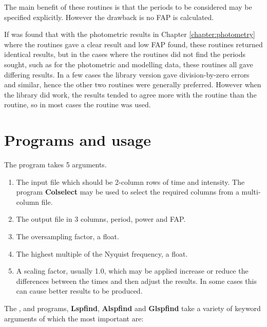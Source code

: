 The main benefit of these routines is that the periods to be considered may be specified explicitly. However the
drawback is no FAP is calculated.

If was found that with the photometric results in Chapter \ref{chapter:photometry} where the {\numrecs} routines gave a
clear result and low FAP found, these routines returned identical results, but in the cases where the {\numrecs}
routines did not find the periods sought, such as for the photometric and modelling data, these routines all gave
differing results. In a few cases the {\scipy} library version gave division-by-zero errors and similar, hence the other
two routines were generally preferred. However when the {\scipy} library did work, the results tended to agree more with
the {\gatspy} routine than the {\astroml} routine, so in most cases the {\gatspy} routine was used.

\section{Programs and usage}

The {\numrecs} program takes 5 arguments.

\begin{enumerate}

\item The input file which should be 2-column rows of time and intensity. The program \textbf{Colselect} may be used to
  select the required columns from a multi-column file.

\item The output file in 3 columns, period, power and FAP.

\item The oversampling factor, a float.

\item The highest multiple of the Nyquist frequency, a float.

\item A scaling factor, usually 1.0, which may be applied increase or reduce the differences between the times and then
  adjust the results. In some cases this can cause better results to be produced.

\end{enumerate}

The {\scipy}, {\astroml} and {\gatspy} programs, \textbf{Lspfind}, \textbf{Alspfind} and \textbf{Glspfind} take a
variety of keyword arguments of which the most important are:

